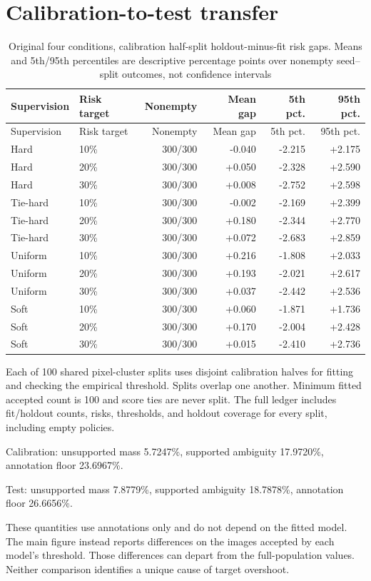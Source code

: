 \documentclass[10pt]{article}
\begin{document}
\clearpage\section{Calibration-to-test transfer}\label{supp:calibration}
\begin{longtable}{llrrrr}
\caption{Original four conditions, calibration half-split holdout-minus-fit risk gaps. Means and 5th/95th percentiles are descriptive percentage points over nonempty seed--split outcomes, not confidence intervals}\\
\toprule Supervision & Risk target & Nonempty & Mean gap & 5th pct. & 95th pct.\\\midrule\endfirsthead
\toprule Supervision & Risk target & Nonempty & Mean gap & 5th pct. & 95th pct.\\\midrule\endhead
Hard & 10\% & 300/300 & -0.040 & -2.215 & +2.175\\
Hard & 20\% & 300/300 & +0.050 & -2.328 & +2.590\\
Hard & 30\% & 300/300 & +0.008 & -2.752 & +2.598\\
Tie-hard & 10\% & 300/300 & -0.002 & -2.169 & +2.399\\
Tie-hard & 20\% & 300/300 & +0.180 & -2.344 & +2.770\\
Tie-hard & 30\% & 300/300 & +0.072 & -2.683 & +2.859\\
Uniform & 10\% & 300/300 & +0.216 & -1.808 & +2.033\\
Uniform & 20\% & 300/300 & +0.193 & -2.021 & +2.617\\
Uniform & 30\% & 300/300 & +0.037 & -2.442 & +2.536\\
Soft & 10\% & 300/300 & +0.060 & -1.871 & +1.736\\
Soft & 20\% & 300/300 & +0.170 & -2.004 & +2.428\\
Soft & 30\% & 300/300 & +0.015 & -2.410 & +2.736\\
\bottomrule\end{longtable}
Each of 100 shared pixel-cluster splits uses disjoint calibration halves for fitting and checking the empirical threshold. Splits overlap one another. Minimum fitted accepted count is 100 and score ties are never split. The full ledger includes fit/holdout counts, risks, thresholds, and holdout coverage for every split, including empty policies.

Calibration: unsupported mass 5.7247\%, supported ambiguity 17.9720\%, annotation floor 23.6967\%.\par
Test: unsupported mass 7.8779\%, supported ambiguity 18.7878\%, annotation floor 26.6656\%.\par
These quantities use annotations only and do not depend on the fitted model. The main figure instead reports differences on the images accepted by each model's threshold. Those differences can depart from the full-population values. Neither comparison identifies a unique cause of target overshoot.
\end{document}
